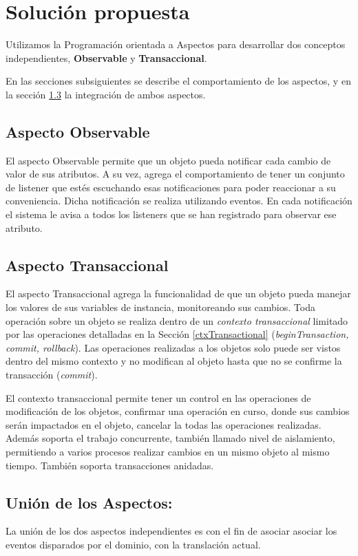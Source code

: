 \section{Solución propuesta}
\label{sec:Solucion}

Utilizamos la Programación orientada a Aspectos para desarrollar dos
conceptos independientes, {\bf Observable} y  {\bf Transaccional}.

En las secciones subsiguientes se describe el comportamiento de los aspectos, y
en la sección \ref{sec:Union} la integración de ambos aspectos.

\subsection{Aspecto Observable}
	El aspecto Observable permite que un objeto pueda notificar cada cambio de
	valor de sus atributos. A su vez, agrega el comportamiento de tener un conjunto
	de listener que estés escuchando esas notificaciones para poder reaccionar a su
	conveniencia.
	Dicha notificación se realiza utilizando eventos. En cada notificación el
	sistema le avisa a todos los listeners que se han registrado para observar ese
	atributo.

\subsection{Aspecto Transaccional}
	El aspecto Transaccional agrega  la funcionalidad de que un objeto pueda
	manejar los valores de sus variables de instancia, monitoreando sus cambios.	
	Toda operación sobre un objeto se realiza dentro de un \emph{contexto
	transaccional} limitado por las operaciones detalladas en la Sección
	\ref{ctxTransactional} (\emph{beginTransaction, commit, rollback}).
	Las operaciones realizadas a los objetos solo puede ser
	vistos dentro del mismo contexto y no modifican al objeto hasta que no se
	confirme la transacción (\emph{commit}).
	 
	El contexto transaccional permite tener un control en las operaciones de
	modificación de los objetos, confirmar una operación en curso, donde sus
	cambios serán impactados en el objeto, cancelar la todas las operaciones
	realizadas. Además soporta el trabajo concurrente, también llamado
	nivel de aislamiento, permitiendo a varios procesos realizar cambios en un
	mismo objeto al mismo tiempo. También soporta transacciones
	anidadas.
	
	
\subsection{Unión de los Aspectos:}
\label{sec:Union}
La unión de los dos aspectos independientes es con el fin de asociar asociar los
eventos disparados por el dominio, con la translación actual.
 
